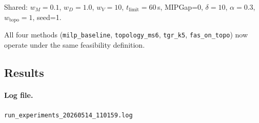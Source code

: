 Shared: $w_M=0.1$, $w_D=1.0$, $w_V=10$, $t_{\text{limit}}=60$\,s,
MIPGap=0, $\delta=10$, $\alpha=0.3$, $w_{\text{topo}}=1$, seed=1.

All four methods (\texttt{milp\_baseline}, \texttt{topology\_ms6},
\texttt{tgr\_k5}, \texttt{fas\_on\_topo}) now operate under the same
feasibility definition.

\subsection{Results}
\label{exp:exp04-results}

\paragraph{Log file.} \texttt{run\_experiments\_20260514\_110159.log}

